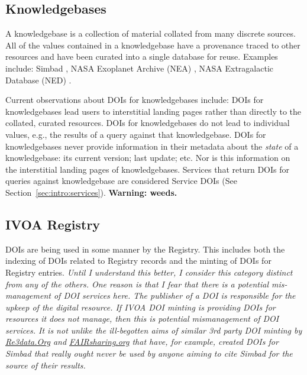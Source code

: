 \documentclass[11pt,a4paper]{ivoa}
\begin{document}
\subsection{Knowledgebases}
\label{sec:intro:kdbs}

A knowledgebase is a collection of material collated from many discrete sources.
All of the values contained in a knowledgebase have a provenance traced to other resources and have been curated into a single database for reuse.
Examples include: Simbad \citep[as originally described in, ][]{2000A&AS..143....9W}, NASA Exoplanet Archive (NEA) \citep{NEA12-doi2bib} \citep[as originally described in,][]{2013PASP..125..989A}, NASA Extragalactic Database (NED) \citep{NED1-doi2bib} \citep[as originally described in,][]{1991ASSL..171...89H}. 

Current observations about DOIs for knowledgebases include:
DOIs for knowledgebases lead users to interstitial landing pages rather than directly to the collated, curated resources.
DOIs for knowledgebases do not lead to individual values, e.g., the results of a query against that knowledgebase.
DOIs for knowledgebases never provide information in their metadata about the \textit{state} of a knowledgebase: its current version; last update; etc. 
Nor is this information on the interstitial landing pages of knowledgebases.
Services that return DOIs for queries against knowledgebase are considered Service DOIs (See Section~\ref{sec:intro:services}).
\textbf{Warning: weeds.}

\subsection{IVOA Registry}
\label{sec:intro:ivoa}
DOIs are being used in some manner by the Registry.
This includes both the indexing of DOIs related to Registry records and the minting of DOIs for Registry entries.
\textit{Until I understand this better, I consider this category distinct from any of the others.  One reason is that I fear that there is a potential mis-management of DOI services here. The publisher of a DOI is responsible for the upkeep of the digital resource. If IVOA DOI minting is providing DOIs for resources it does not manage, then this is potential mismanagement of DOI services. It is not unlike the ill-begotten aims of similar 3rd party DOI minting by \url{Re3data.Org} and \url{FAIRsharing.org} that have, for example, created DOIs for Simbad \citep{https://doi.org/10.17616/r39w29,https://doi.org/10.25504/fairsharing.rd6gxr} that really ought never be used by anyone aiming to cite Simbad for the source of their results. }
\end{document}
